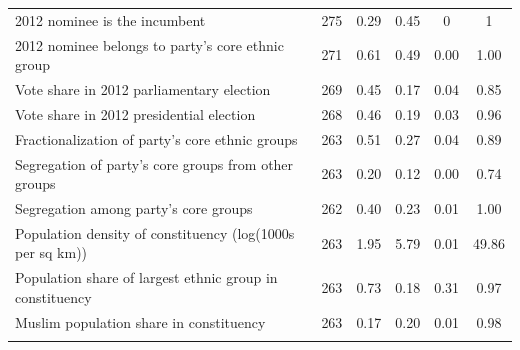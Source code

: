 \begin{table}[!htbp]
\begin{tabular}{@{\extracolsep{3pt}}lccccc}
2012 nominee is the incumbent & 275 & 0.29 & 0.45 & 0 & 1 \\ 
2012 nominee belongs to party's core ethnic group & 271 & 0.61 & 0.49 & 0.00 & 1.00 \\ 
Vote share in 2012 parliamentary election & 269 & 0.45 & 0.17 & 0.04 & 0.85 \\ 
Vote share in 2012 presidential election & 268 & 0.46 & 0.19 & 0.03 & 0.96 \\ 
Fractionalization of party's core ethnic groups & 263 & 0.51 & 0.27 & 0.04 & 0.89 \\ 
Segregation of party's core groups from other groups & 263 & 0.20 & 0.12 & 0.00 & 0.74 \\ 
Segregation among party's core groups & 262 & 0.40 & 0.23 & 0.01 & 1.00 \\ 
Population density of constituency (log(1000s per sq km)) & 263 & 1.95 & 5.79 & 0.01 & 49.86 \\ 
Population share of largest ethnic group in constituency & 263 & 0.73 & 0.18 & 0.31 & 0.97 \\ 
Muslim population share in constituency & 263 & 0.17 & 0.20 & 0.01 & 0.98 \\ 
\hline \\[-1.8ex] 
\end{tabular} 
\end{table} 
